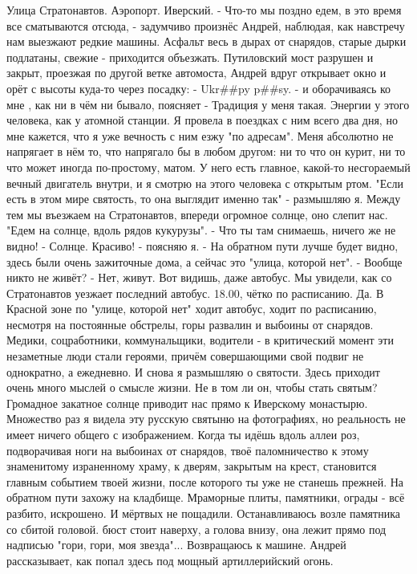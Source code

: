 Улица Стратонавтов. Аэропорт. Иверский.
- Что-то мы поздно едем, в это время все сматываются отсюда, - задумчиво произнёс Андрей, наблюдая, как навстречу нам выезжают редкие машины.
Асфальт весь в дырах от снарядов, старые дырки подлатаны, свежие - приходится объезжать.
Путиловский мост разрушен и закрыт, проезжая по другой ветке автомоста, Андрей вдруг открывает окно и орёт с высоты куда-то через посадку:
- Ukr\#\#py p\#\#sy. - и оборачиваясь ко мне , как ни в чём ни бывало, поясняет - Традиция у меня такая.
Энергии у этого человека, как у атомной станции. Я провела в поездках с ним всего два дня, но мне кажется, что я уже вечность с ним езжу "по адресам". Меня абсолютно не напрягает в нём то, что напрягало бы в любом другом: ни то что он курит, ни то что может иногда по-простому, матом. У него есть главное, какой-то несгораемый вечный двигатель внутри, и я смотрю на этого человека с открытым ртом. "Если есть в этом мире святость, то она выглядит именно так" - размышляю я.
Между тем мы въезжаем на Стратонавтов, впереди огромное солнце, оно слепит нас. "Едем на солнце, вдоль рядов кукурузы".
- Что ты там снимаешь, ничего же не видно!
- Солнце. Красиво! - поясняю я.
- На обратном пути лучше будет видно, здесь были очень зажиточные дома, а сейчас это "улица, которой нет".
- Вообще никто не живёт?
- Нет, живут. Вот видишь, даже автобус.
Мы увидели, как со Стратонавтов уезжает последний автобус. 18.00, чётко по расписанию. Да. В Красной зоне по "улице, которой нет" ходит автобус, ходит по расписанию, несмотря на постоянные обстрелы, горы развалин и выбоины от снарядов. Медики, соцработники, коммунальщики, водители - в критический момент эти незаметные люди стали героями, причём совершающими свой подвиг не однократно, а ежедневно.
И снова я размышляю о святости. Здесь приходит очень много мыслей о смысле жизни. Не в том ли он, чтобы стать святым?
Громадное закатное солнце приводит нас прямо к Иверскому монастырю. Множество раз я видела эту русскую святыню на фотографиях, но реальность не имеет ничего общего с изображением. Когда ты идёшь вдоль аллеи роз, подворачивая ноги на выбоинах от снарядов, твоё паломничество к этому знаменитому израненному храму, к дверям, закрытым на крест, становится главным событием твоей жизни, после которого ты уже не станешь прежней.
На обратном пути захожу на кладбище. Мраморные плиты, памятники, ограды - всё разбито, искрошено. И мёртвых не пощадили.
Останавливаюсь возле памятника со сбитой головой. бюст стоит наверху, а голова внизу, она лежит прямо под надписью "гори, гори, моя звезда"...
Возвращаюсь к машине.
Андрей рассказывает, как попал здесь под мощный артиллерийский огонь.
